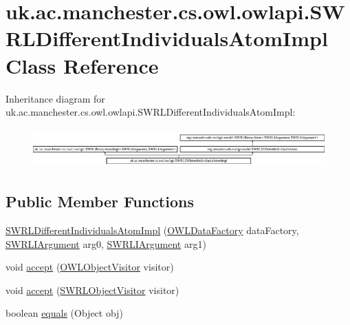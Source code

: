 \hypertarget{classuk_1_1ac_1_1manchester_1_1cs_1_1owl_1_1owlapi_1_1_s_w_r_l_different_individuals_atom_impl}{\section{uk.\-ac.\-manchester.\-cs.\-owl.\-owlapi.\-S\-W\-R\-L\-Different\-Individuals\-Atom\-Impl Class Reference}
\label{classuk_1_1ac_1_1manchester_1_1cs_1_1owl_1_1owlapi_1_1_s_w_r_l_different_individuals_atom_impl}
}
Inheritance diagram for uk.\-ac.\-manchester.\-cs.\-owl.\-owlapi.\-S\-W\-R\-L\-Different\-Individuals\-Atom\-Impl\-:\begin{figure}[H]
\begin{center}
\leavevmode
\includegraphics[height=1.521739cm]{classuk_1_1ac_1_1manchester_1_1cs_1_1owl_1_1owlapi_1_1_s_w_r_l_different_individuals_atom_impl}
\end{center}
\end{figure}
\subsection*{Public Member Functions}
\begin{DoxyCompactItemize}
\item 
\hyperlink{classuk_1_1ac_1_1manchester_1_1cs_1_1owl_1_1owlapi_1_1_s_w_r_l_different_individuals_atom_impl_a720b877772eb8dfb84a0dadc98242d90}{S\-W\-R\-L\-Different\-Individuals\-Atom\-Impl} (\hyperlink{interfaceorg_1_1semanticweb_1_1owlapi_1_1model_1_1_o_w_l_data_factory}{O\-W\-L\-Data\-Factory} data\-Factory, \hyperlink{interfaceorg_1_1semanticweb_1_1owlapi_1_1model_1_1_s_w_r_l_i_argument}{S\-W\-R\-L\-I\-Argument} arg0, \hyperlink{interfaceorg_1_1semanticweb_1_1owlapi_1_1model_1_1_s_w_r_l_i_argument}{S\-W\-R\-L\-I\-Argument} arg1)
\item 
void \hyperlink{classuk_1_1ac_1_1manchester_1_1cs_1_1owl_1_1owlapi_1_1_s_w_r_l_different_individuals_atom_impl_adb32759bf4dd519f0eaa32fd8008b82c}{accept} (\hyperlink{interfaceorg_1_1semanticweb_1_1owlapi_1_1model_1_1_o_w_l_object_visitor}{O\-W\-L\-Object\-Visitor} visitor)
\item 
void \hyperlink{classuk_1_1ac_1_1manchester_1_1cs_1_1owl_1_1owlapi_1_1_s_w_r_l_different_individuals_atom_impl_af0f945223474d2fb0464828910b02d15}{accept} (\hyperlink{interfaceorg_1_1semanticweb_1_1owlapi_1_1model_1_1_s_w_r_l_object_visitor}{S\-W\-R\-L\-Object\-Visitor} visitor)
\item 
boolean \hyperlink{classuk_1_1ac_1_1manchester_1_1cs_1_1owl_1_1owlapi_1_1_s_w_r_l_different_individuals_atom_impl_a99a9b60e0a5b1d8f5913ccc41df2d26b}{equals} (Object obj)
\end{DoxyCompactItemize}
